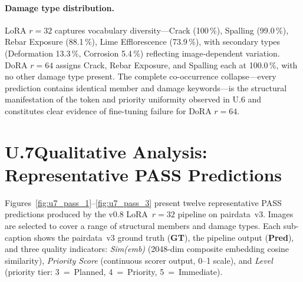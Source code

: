 \documentclass[onecolumn]{article}
\begin{document}
\paragraph{Damage type distribution.}
LoRA $r{=}32$ captures vocabulary diversity---Crack (100\,\%),
Spalling (99.0\,\%), Rebar Exposure (88.1\,\%), Lime Efflorescence
(73.9\,\%), with secondary types (Deformation 13.3\,\%, Corrosion
5.4\,\%) reflecting image-dependent variation.
DoRA $r{=}64$ assigns Crack, Rebar Exposure, and Spalling each
at 100.0\,\%, with no other damage type present.
The complete co-occurrence collapse---every prediction contains
identical member and damage keywords---is the structural manifestation
of the token and priority uniformity observed in U.6 and constitutes
clear evidence of fine-tuning failure for DoRA $r{=}64$.

\clearpage
\section*{U.7\quad Qualitative Analysis: Representative PASS Predictions}
\label{sec:u7}

Figures~\ref{fig:u7_pass_1}--\ref{fig:u7_pass_3} present twelve representative
PASS predictions produced by the v0.8 LoRA~$r{=}32$ pipeline on pairdata~v3.
Images are selected to cover a range of structural members and damage types.
Each sub-caption shows the pairdata~v3 ground truth (\textbf{GT}),
the pipeline output (\textbf{Pred}),
and three quality indicators:
\textit{Sim(emb)} (2048-dim composite embedding cosine similarity),
\textit{Priority Score} (continuous scorer output, 0--1 scale), and
\textit{Level} (priority tier: 3~=~Planned, 4~=~Priority, 5~=~Immediate).
\end{document}
